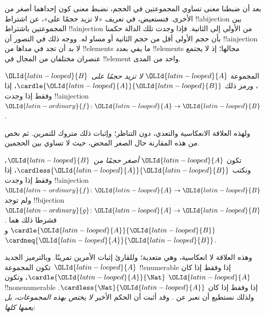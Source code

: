 \documentclass[../../../include/open-logic-section]{subfiles}
\begin{document}


\begin{explain}
بعد أن ضبطنا معنى تساوي المجموعتين في الحجم، نضبط معنى كون إحداهما أصغر من الأخرى. فنستعيض، في تعريف «لا تزيد حجمًا على»، عن اشتراط !!a{bijection} بين المجموعتين باشتراط !!a{injection} من الأولى إلى الثانية. فإذا وجدت تلك الدالة حكمنا بأن حجم الأولى أقل من حجم الثانية أو مساو له. ووجه ذلك في التصور أن !!a{injection} لا بد أن تجد في مداها من !!{element}s ما يفي بعدد !!{element}s مجالها؛ إذ لا يجتمع عنصران مختلفان من المجال في !!{element} واحد من المدى.
\end{explain}

\begin{defn}
المجموعة $\OLId{latin-looped}{A}$ \emph{لا تزيد حجمًا على}~$\OLId{latin-looped}{B}$، ورمز ذلك $\cardle{\OLId{latin-looped}{A}}{\OLId{latin-looped}{B}}$، إذا وفقط إذا وجدت !!a{injection} $\OLId{latin-ordinary}{f} \colon \OLId{latin-looped}{A} \to \OLId{latin-looped}{B}$.
\end{defn}

ولهذه العلاقة الانعكاسية والتعدي، دون التناظر؛ وإثبات ذلك متروك للتمرين. ثم نخص من هذه المقارنة حال الصغر المحض، حيث لا تساوي بين الحجمين.

\begin{defn}
تكون $\OLId{latin-looped}{A}$ \emph{أصغر حجمًا من}~$\OLId{latin-looped}{B}$، ونكتب $\cardless{\OLId{latin-looped}{A}}{\OLId{latin-looped}{B}}$، إذا وفقط إذا وجدت !!a{injection}~$\OLId{latin-ordinary}{f}\colon \OLId{latin-looped}{A} \to \OLId{latin-looped}{B}$ ولم توجد !!{bijection}~$\OLId{latin-ordinary}{g}\colon \OLId{latin-looped}{A}
\to \OLId{latin-looped}{B}$. فشرطا ذلك هما $\cardle{\OLId{latin-looped}{A}}{\OLId{latin-looped}{B}}$ و$\cardneq{\OLId{latin-looped}{A}}{\OLId{latin-looped}{B}}$.
\end{defn}

وهذه العلاقة لا انعكاسية، وهي متعدية؛ وللقارئ إثبات الأمرين تمرينًا. وبالترميز الجديد تكون المجموعة~$\OLId{latin-looped}{A}$ !!{enumerable} إذا وفقط إذا كان $\cardle{\OLId{latin-looped}{A}}{\Nat}$، وتكون $\OLId{latin-looped}{A}$ !!{nonenumerable} إذا وفقط إذا كان $\cardless{\Nat}{\OLId{latin-looped}{A}}$. ولذلك نستطيع أن نعبر عن
. وقد أثبت \citet{Cantor1892} أن الحكم الأخير \emph{لا يختص بهذه المجموعات، بل يعمها كلها}:
\end{document}
